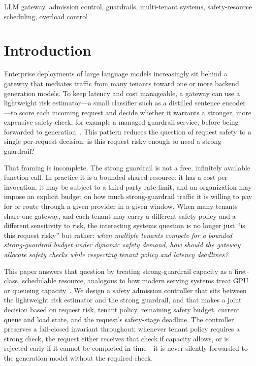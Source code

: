 \documentclass[conference]{IEEEtran}
\begin{document}
\begin{IEEEkeywords}
LLM gateway, admission control, guardrails, multi-tenant systems, safety-resource scheduling, overload control
\end{IEEEkeywords}

\section{Introduction}

Enterprise deployments of large language models increasingly sit behind a gateway that mediates traffic from many tenants toward one or more backend generation models. To keep latency and cost manageable, a gateway can use a lightweight risk estimator---a small classifier such as a distilled sentence encoder---to score each incoming request and decide whether it warrants a stronger, more expensive safety check, for example a managed guardrail service, before being forwarded to generation~\cite{inan2023llamaguard,rebedea2023nemo,aws_applyguardrail}. This pattern reduces the question of request safety to a single per-request decision: is this request risky enough to need a strong guardrail?

That framing is incomplete. The strong guardrail is not a free, infinitely available function call. In practice it is a bounded shared resource: it has a cost per invocation, it may be subject to a third-party rate limit, and an organization may impose an explicit budget on how much strong-guardrail traffic it is willing to pay for or route through a given provider in a given window. When many tenants share one gateway, and each tenant may carry a different safety policy and a different sensitivity to risk, the interesting systems question is no longer just ``is this request risky'' but rather: \emph{when multiple tenants compete for a bounded strong-guardrail budget under dynamic safety demand, how should the gateway allocate safety checks while respecting tenant policy and latency deadlines?}

This paper answers that question by treating strong-guardrail capacity as a first-class, schedulable resource, analogous to how modern serving systems treat GPU or queueing capacity~\cite{sheng2024fairness,sun2024llumnix,zhong2024distserve,agrawal2024sarathi}. We design a safety admission controller that sits between the lightweight risk estimator and the strong guardrail, and that makes a joint decision based on request risk, tenant policy, remaining safety budget, current queue and load state, and the request's safety-stage deadline. The controller preserves a fail-closed invariant throughout: whenever tenant policy requires a strong check, the request either receives that check if capacity allows, or is rejected early if it cannot be completed in time---it is never silently forwarded to the generation model without the required check.
\end{document}
